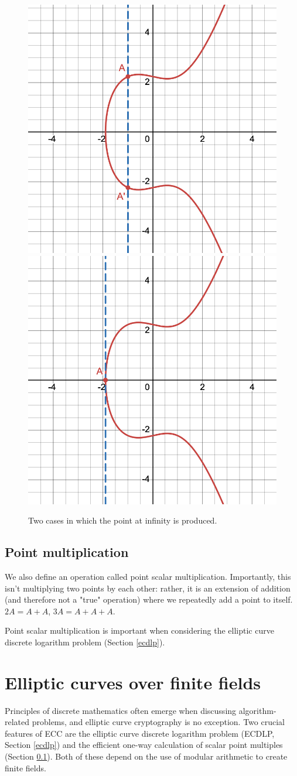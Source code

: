 \documentclass[a4paper]{article}
\begin{document}
\begin{figure}[h]
    \centering
    \includegraphics[width=0.3\linewidth]{images/infty-inverse.png}
    \includegraphics[width=0.3\linewidth]{images/infty-tangent.png}
    \caption{Two cases in which the point at infinity is produced.}
    \label{fig:infinity}
\end{figure}

\subsection{Point multiplication}\label{mul}

We also define an operation called point scalar multiplication. Importantly, this isn't multiplying two points by each other: rather, it is an extension of addition (and therefore not a "true" operation) where we repeatedly add a point to itself. $2A = A + A$, $3A = A + A + A$.\cite{guide}

Point scalar multiplication is important when considering the elliptic curve discrete logarithm problem (Section \ref{ecdlp}).


\section{Elliptic curves over finite fields}

Principles of discrete mathematics often emerge when discussing algorithm-related problems, and elliptic curve cryptography is no exception. Two crucial features of ECC are the elliptic curve discrete logarithm problem (ECDLP, Section \ref{ecdlp}) and the efficient one-way calculation of scalar point multiples (Section \ref{mul}). Both of these depend on the use of modular arithmetic to create finite fields.
\end{document}
